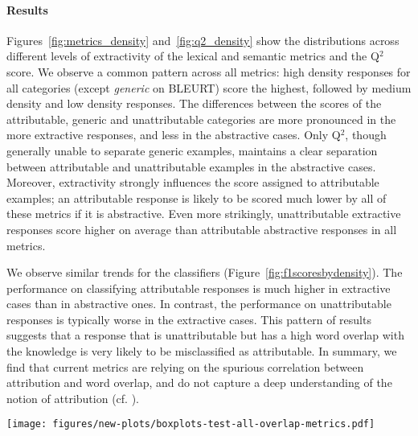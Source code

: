 \paragraph{Results} Figures~\ref{fig:metrics_density} and~\ref{fig:q2_density} show the distributions across different levels of extractivity of the lexical and semantic metrics and the Q$^2$ score. 
We observe a common pattern across all metrics: high density responses for all categories (except \textit{generic} on BLEURT) score the highest, followed by medium density and low density responses.
The differences between the scores of the attributable, generic and unattributable categories are more pronounced in the more extractive responses, and less in the abstractive cases. Only Q$^2$, though generally unable to separate generic examples, maintains a clear separation between attributable and unattributable examples in the abstractive cases. Moreover, extractivity strongly influences the score assigned to attributable examples; an attributable response is likely to be scored much lower by all of these metrics if it is abstractive. Even more strikingly, unattributable extractive responses score higher on average than attributable abstractive responses in all metrics. 

We observe similar trends for the classifiers (Figure~\ref{fig:f1scoresbydensity}). The performance on  classifying attributable responses is much higher in extractive cases than in abstractive ones.  In contrast, the performance on unattributable responses is typically worse in the extractive cases. This pattern of results suggests that a response that is unattributable but has a high word overlap with the knowledge is very likely to be misclassified as attributable.  
In summary, we find that current metrics are relying on the spurious correlation between attribution and word overlap, and do not capture a deep understanding of the notion of attribution (cf. \citealt{mccoy-etal-2019-right}).

 
\begin{figure*}[ht]
\centering
\texttt{[image: figures/new-plots/boxplots-test-all-overlap-metrics.pdf]}
\caption{\small Scores assigned to each of the three \begindata{} categories by semantic similarity metrics (upper row) and lexical overlap metrics (lower row), broken down by extractivity of the response (the extent to which it copies verbatim from the knowledge).}
\label{fig:metrics_density}
  \vspace{-15pt}
\end{figure*}


